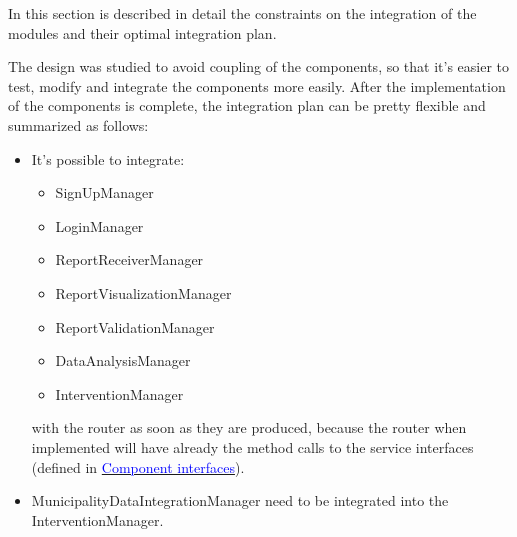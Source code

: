 In this section is described in detail the constraints on the integration of the modules and their optimal integration plan.

The design was studied to avoid coupling of the components, so that it's easier to test, modify and integrate the components more easily. After the implementation of the components is complete, the integration plan can be pretty flexible and summarized as follows:

\begin{itemize}
	\item It's possible to integrate:
	\begin{itemize}
		\item SignUpManager
		\item LoginManager
		\item ReportReceiverManager
		\item ReportVisualizationManager
		\item ReportValidationManager
		\item DataAnalysisManager
		\item InterventionManager 
	\end{itemize}
	with the router as soon as they are produced, because the router when implemented will have already the method calls to the service interfaces (defined in \hyperref[sec:interfaces]{\textcolor{blue}{Component interfaces}}).
	\item MunicipalityDataIntegrationManager need to be integrated into the InterventionManager.
\end{itemize} 